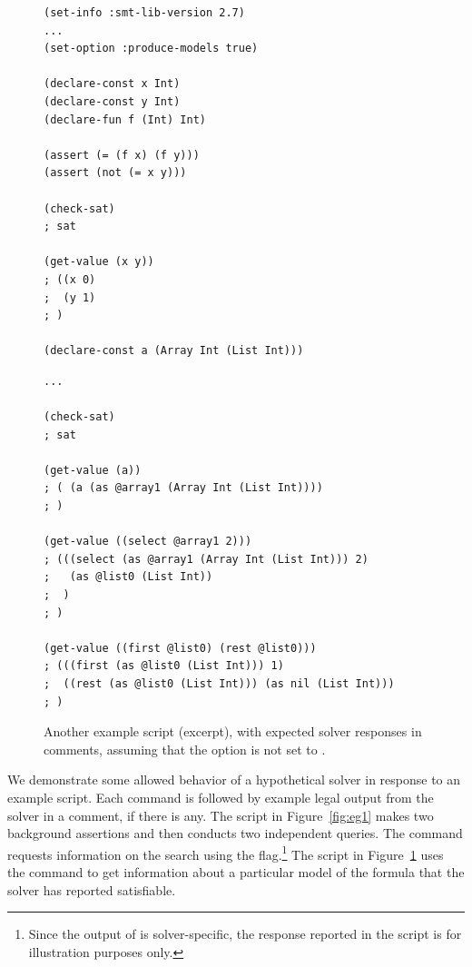 \begin{figure}
\footnotesize
\begin{minipage}[t]{.45\linewidth}
\begin{verbatim}
(set-info :smt-lib-version 2.7)
...
(set-option :produce-models true)

(declare-const x Int)
(declare-const y Int)
(declare-fun f (Int) Int)

(assert (= (f x) (f y)))
(assert (not (= x y)))

(check-sat)
; sat

(get-value (x y))
; ((x 0)
;  (y 1)
; )

(declare-const a (Array Int (List Int)))
\end{verbatim}
\end{minipage}
%
\begin{minipage}[t]{.5\linewidth}
\begin{verbatim}
...

(check-sat)
; sat

(get-value (a))
; ( (a (as @array1 (Array Int (List Int))))
; )

(get-value ((select @array1 2)))
; (((select (as @array1 (Array Int (List Int))) 2) 
;   (as @list0 (List Int))
;  )
; )

(get-value ((first @list0) (rest @list0)))
; (((first (as @list0 (List Int))) 1)
;  ((rest (as @list0 (List Int))) (as nil (List Int)))
; )
\end{verbatim}
\end{minipage}
\medskip

\caption{\label{fig:eg2}
Another example script (excerpt), with expected solver responses in comments, assuming that the  option is not set to .
}
\end{figure}

We demonstrate some allowed behavior of a hypothetical solver in response
to an example script.  Each command is followed by example legal
output from the solver in a comment, if there is any.  The script in
Figure~\ref{fig:eg1} makes two background assertions and then
conducts two independent queries.  The  command requests
information on the search using the  flag.\footnote{%
Since the output of  is solver-specific,
the response reported in the script is for illustration purposes only.
}
The script in Figure~\ref{fig:eg2} uses
the  command to get information about a particular
model of the formula that the solver has reported satisfiable.


